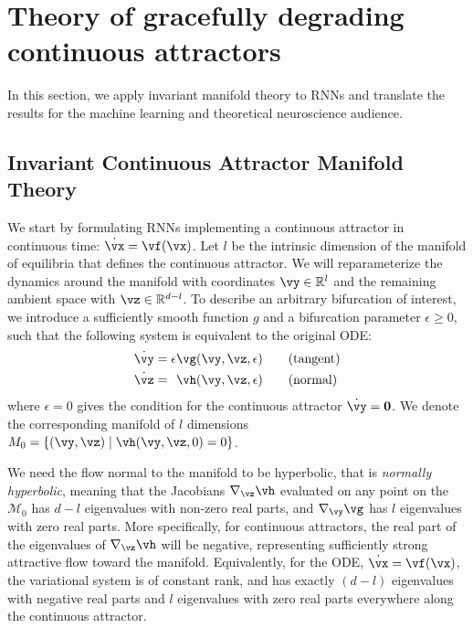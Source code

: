 \documentclass{article} %
\newcounter{ct}
\newcommand{\reals}{\mathbb{R}}
\newcommand{\manifold}{\mathcal{M}}
\theoremstyle{definition}
\theoremstyle{remark}
\begin{document}

\section{Theory of gracefully degrading continuous attractors}\label{sec:theory}
In this section, we apply invariant manifold theory to RNNs and translate the results for the machine learning and theoretical neuroscience audience.

\subsection{Invariant Continuous Attractor Manifold Theory}\label{sec:imt}
We start by formulating RNNs implementing a continuous attractor in continuous time: $\dot{\vx} = \vf(\vx)$.
Let $l$ be the intrinsic dimension of the manifold of equilibria that defines the continuous attractor.
We will reparameterize the dynamics around the manifold with coordinates $\vy \in \reals^l$ and the remaining ambient space with $\vz \in \reals^{d-l}$.
To describe an arbitrary bifurcation of interest, we introduce a sufficiently smooth function $g$ and a bifurcation parameter $\epsilon \geq 0$, such that the following system is equivalent to the original ODE:
\begin{align}\label{eq:fenichel:flow}
    \dot{\vy} &=           \epsilon  \vg(\vy, \vz, \epsilon) \qquad \text{(tangent)}\\
    \dot{\vz} &= \hphantom{\epsilon} \vh(\vy, \vz, \epsilon) \qquad \text{(normal)}
\end{align}
where $\epsilon = 0$ gives the condition for the continuous attractor $\dot{\vy} = \mathbf{0}$.
We denote the corresponding manifold of $l$ dimensions $M_0 = \{(\vy,\vz) \mid \vh(\vy,\vz,0) = 0\}$.

We need the flow normal to the manifold to be hyperbolic, that is \emph{normally hyperbolic}, meaning that the Jacobians $\nabla_\vz \vh$ evaluated on any point on the $\manifold_0$ has $d-l$ eigenvalues with non-zero real parts, and $\nabla_\vy \vg$ has $l$ eigenvalues with zero real parts.
More specifically, for continuous attractors, the real part of the eigenvalues of $\nabla_\vz \vh$ will be negative, representing sufficiently strong attractive flow toward the manifold.
Equivalently, for the ODE, $\dot{\vx} = \vf(\vx)$, the variational system is of constant rank, and has exactly $(d-l)$ eigenvalues with negative real parts and $l$ eigenvalues with zero real parts everywhere along the continuous attractor.
\end{document}
